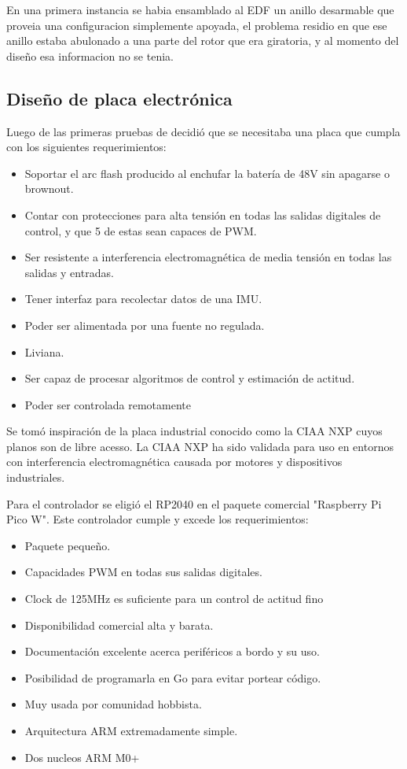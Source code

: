 \medskip

En una primera instancia se habia ensamblado al EDF un anillo
desarmable que proveia una configuracion simplemente apoyada, el problema residio en que ese anillo
estaba abulonado a una parte del rotor que era giratoria, y al momento del diseño esa informacion no
se tenia.


\subsection{Diseño de placa electrónica} \label{ssec:electronicsdesign}
Luego de las primeras pruebas de decidió que se necesitaba una placa que cumpla con los siguientes requerimientos:

\begin{itemize}
    \item Soportar el arc flash producido al enchufar la batería de 48V sin apagarse o brownout.
    \item Contar con protecciones para alta tensión en todas las salidas digitales de control, y que 5 de estas sean capaces de PWM.
    \item Ser resistente a interferencia electromagnética de media tensión en todas las salidas y entradas.
    \item Tener interfaz para recolectar datos de una IMU.
    \item Poder ser alimentada por una fuente no regulada.
    \item Liviana.
    \item Ser capaz de procesar algoritmos de control y estimación de actitud.
    \item Poder ser controlada remotamente
\end{itemize}

Se tomó inspiración de la placa industrial conocido como la CIAA NXP cuyos planos son
de libre acesso. La CIAA NXP ha sido validada para uso en entornos con interferencia electromagnética causada por motores y dispositivos industriales.

Para el controlador se eligió el RP2040 en el paquete comercial "Raspberry Pi Pico W". 
Este controlador cumple y excede los requerimientos:
\begin{itemize}
    \item Paquete pequeño.
    \item Capacidades PWM en todas sus salidas digitales.
    \item Clock de 125MHz es suficiente para un control de actitud fino
    \item Disponibilidad comercial alta y barata.
    \item Documentación excelente acerca periféricos a bordo y su uso.
    \item Posibilidad de programarla en Go para evitar portear código.
    \item Muy usada por comunidad hobbista.
    \item Arquitectura ARM extremadamente simple.
    \item Dos nucleos ARM M0+
\end{itemize}

